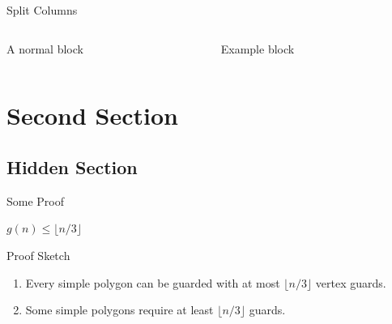 \documentclass{beamer}
\begin{document}
\begin{frame}{Split Columns}
    \begin{columns}
    \begin{column}{0.5\textwidth}
          \begin{block}{A normal block}
          \end{block} 
    \end{column}
    \begin{column}{0.5\textwidth}  %
        \begin{exampleblock}{Example block}
        \end{exampleblock} 
    \end{column}
    \end{columns}
\end{frame}

\section{Second Section}
\subsection*{Hidden Section}%

\begin{frame}{Some Proof}
  \begin{theorem}
      $g(n) \leq \lfloor n/3\rfloor$
  \end{theorem}
  \begin{block}{Proof Sketch}
      \begin{enumerate}
      \item Every simple polygon can be guarded 
            with at most $\lfloor n/3\rfloor$ vertex guards.
      \item Some simple polygons require at least $\lfloor n/3\rfloor$ guards.
      \end{enumerate}
  \end{block}
\end{frame}
\end{document}
